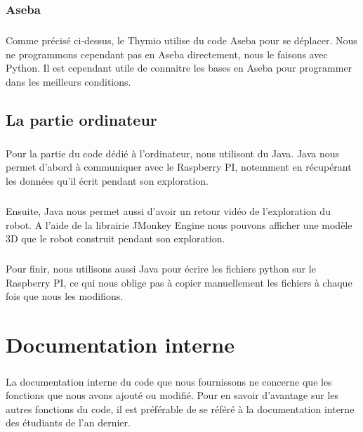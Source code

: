 \documentclass[12pt]{report}
\begin{document}
\subsection{Aseba}
\paragraph{}
Comme précisé ci-dessus, le Thymio utilise du code Aseba pour se déplacer. Nous ne programmons cependant pas en Aseba directement, nous le faisons avec Python. Il est cependant utile de connaitre les bases en Aseba pour programmer dans les meilleurs conditions.

\section{La partie ordinateur}
\paragraph{}
Pour la partie du code dédié à l'ordinateur, nous utilisont du Java. Java nous permet d'abord à communiquer avec le Raspberry PI, notemment en récupérant les données qu'il écrit pendant son exploration.

\paragraph{}
Ensuite, Java nous permet aussi d'avoir un retour vidéo de l'exploration du robot. A l'aide de la librairie JMonkey Engine nous pouvons afficher une modèle 3D que le robot construit pendant son exploration.

\paragraph{}
Pour finir, nous utilisons aussi Java pour écrire les fichiers python sur le Raspberry PI, ce qui nous oblige pas à copier manuellement les fichiers à chaque fois que nous les modifions.

\chapter{Documentation interne}
\paragraph{}
La documentation interne du code que nous fournissons ne concerne que les fonctions que nous avons ajouté ou modifié. Pour en savoir d'avantage sur les autres fonctions du code, il est préférable de se référé à la documentation interne des étudiants de l'an dernier.
\end{document}
